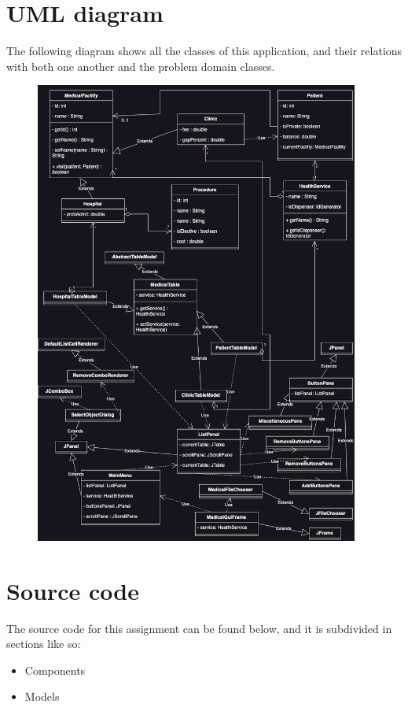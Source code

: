 \documentclass{article}
\begin{document}
\section{UML diagram}
The following diagram shows all the classes of this application, and their relations with both one another and the problem domain classes.
\begin{figure}[ht]
  \begin{center}
    \includegraphics[width=0.95\textwidth]{figures/UML_diagram.png}
  \end{center}
\end{figure}

\newpage

\section{Source code}%
\label{sec:source_code}
The source code for this assignment can be found below, and it is subdivided in sections like so:
\begin{itemize}
  \item Components
  \item Models
\end{itemize}
\end{document}
